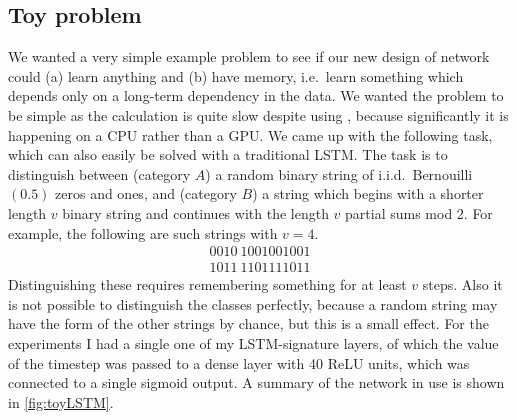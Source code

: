 \subsection{Toy problem}
We wanted a very simple example problem to see if our new design of network could (a) learn anything and (b) have memory, i.e.~learn something which depends only on a long-term dependency in the data. We wanted the problem to be simple as the calculation is quite slow despite using \ii, because significantly it is happening on a CPU rather than a GPU\@. We came up with the following task, which  can also easily be solved with a traditional LSTM\@. The task is to distinguish between (category $A$) a random binary string of i.i.d.~Bernouilli$(0.5)$ zeros and ones, and (category $B$) a string which begins with a shorter length $v$ binary string and continues with the length $v$ partial sums mod 2. For example, the following are such strings with $v=4$.
\begin{align*}
0010\ 1001001001\\
1011\ 1101111011
\end{align*}
Distinguishing these requires remembering something for at least $v$ steps. 
Also it is not possible to distinguish the classes perfectly, because a random string may have the form of the other strings by chance, but this is a small effect.
For the experiments I had a single one of my LSTM-signature layers, of which the value of the timestep was passed to a dense layer with 40 ReLU units, which was connected to a single sigmoid output. A summary of the network in use is shown in \autoref{fig:toyLSTM}.
